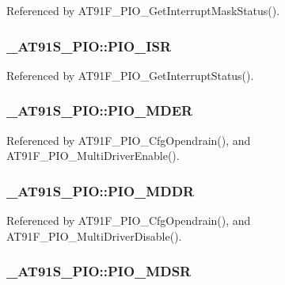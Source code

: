 Referenced by AT91F\_\-PIO\_\-GetInterruptMaskStatus().\hypertarget{struct__AT91S__PIO_2f6a6590e2a939e442401432b516b4c6}{
\subsubsection{ {\bf \_\-AT91S\_\-PIO::PIO\_\-ISR}}}
\label{struct__AT91S__PIO_2f6a6590e2a939e442401432b516b4c6}




Referenced by AT91F\_\-PIO\_\-GetInterruptStatus().\hypertarget{struct__AT91S__PIO_e02885f3daa5b89ae8c6c35758d11964}{
\subsubsection{ {\bf \_\-AT91S\_\-PIO::PIO\_\-MDER}}}
\label{struct__AT91S__PIO_e02885f3daa5b89ae8c6c35758d11964}




Referenced by AT91F\_\-PIO\_\-CfgOpendrain(), and AT91F\_\-PIO\_\-MultiDriverEnable().\hypertarget{struct__AT91S__PIO_7ab27adf16a2d8f50153ff4f2888f9a8}{
\subsubsection{ {\bf \_\-AT91S\_\-PIO::PIO\_\-MDDR}}}
\label{struct__AT91S__PIO_7ab27adf16a2d8f50153ff4f2888f9a8}




Referenced by AT91F\_\-PIO\_\-CfgOpendrain(), and AT91F\_\-PIO\_\-MultiDriverDisable().\hypertarget{struct__AT91S__PIO_7cab27126174a8db628307dd96c3ee0e}{
\subsubsection{ {\bf \_\-AT91S\_\-PIO::PIO\_\-MDSR}}}
\label{struct__AT91S__PIO_7cab27126174a8db628307dd96c3ee0e}





